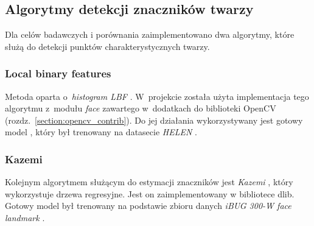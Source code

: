 \subsection{Algorytmy detekcji znaczników twarzy}

Dla celów badawczych i porównania zaimplementowano dwa algorytmy, które służą do detekcji punktów charakterystycznych twarzy.


\subsubsection{Local binary features}

Metoda oparta o~\textit{histogram LBF} \cite{lbpFacemark}. W~projekcie została użyta implementacja tego algorytmu z~modułu \textit{face} \cite{opencvcontribface} zawartego w~dodatkach do biblioteki OpenCV (rozdz.~\ref{section:opencv_contrib}). Do jej działania wykorzystywany jest gotowy model \cite{lbpfacemarkmodel}, który był trenowany na datasecie \textit{HELEN} \cite{helen_dataset}.


\subsubsection{Kazemi}

Kolejnym algorytmem służącym do estymacji znaczników jest \textit{Kazemi} \cite{kazemi}, który wykorzystuje drzewa regresyjne. Jest on zaimplementowany w bibliotece dlib. Gotowy model był trenowany na podstawie zbioru danych \textit{iBUG 300-W face landmark} \cite{300Ibugdataset}.


